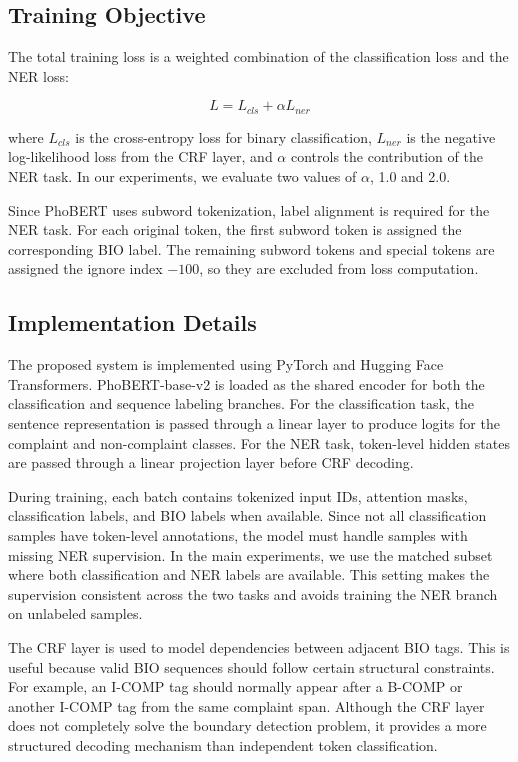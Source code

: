 \documentclass[11pt]{article}
\begin{document}
\subsection{Training Objective}

The total training loss is a weighted combination of the classification loss and the NER loss:

\begin{equation}
L = L_{cls} + \alpha L_{ner}
\end{equation}

where \(L_{cls}\) is the cross-entropy loss for binary classification, \(L_{ner}\) is the negative log-likelihood loss from the CRF layer, and \(\alpha\) controls the contribution of the NER task. In our experiments, we evaluate two values of \(\alpha\), 1.0 and 2.0.

Since PhoBERT uses subword tokenization, label alignment is required for the NER task. For each original token, the first subword token is assigned the corresponding BIO label. The remaining subword tokens and special tokens are assigned the ignore index \(-100\), so they are excluded from loss computation.

\subsection{Implementation Details}

The proposed system is implemented using PyTorch and Hugging Face Transformers. PhoBERT-base-v2 is loaded as the shared encoder for both the classification and sequence labeling branches. For the classification task, the sentence representation is passed through a linear layer to produce logits for the complaint and non-complaint classes. For the NER task, token-level hidden states are passed through a linear projection layer before CRF decoding.

During training, each batch contains tokenized input IDs, attention masks, classification labels, and BIO labels when available. Since not all classification samples have token-level annotations, the model must handle samples with missing NER supervision. In the main experiments, we use the matched subset where both classification and NER labels are available. This setting makes the supervision consistent across the two tasks and avoids training the NER branch on unlabeled samples.

The CRF layer is used to model dependencies between adjacent BIO tags. This is useful because valid BIO sequences should follow certain structural constraints. For example, an I-COMP tag should normally appear after a B-COMP or another I-COMP tag from the same complaint span. Although the CRF layer does not completely solve the boundary detection problem, it provides a more structured decoding mechanism than independent token classification.
\end{document}
